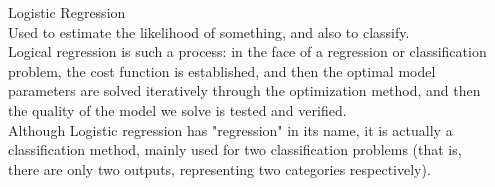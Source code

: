 \documentclass{tikzposter} %
\begin{document}
\begin{columns}
{\begin{description}
\end{description}
\begin{description}
  \item  Logistic Regression\\
  Used to estimate the likelihood of something, and also to classify.\\
  Logical regression is such a process: in the face of a regression or classification problem,
   the cost function is established, and then the optimal model parameters are solved iteratively through the
    optimization method, and then the quality of the model we solve is tested and verified.\\
Although Logistic regression has "regression" in its name, it is actually a classification method, 
mainly used for two classification problems (that is, there are only two outputs, representing two categories respectively).

\end{description}
    
  
  	
}
\end{columns}
\end{document}
